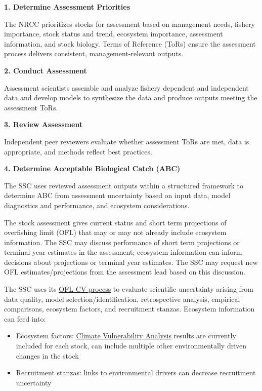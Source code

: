 \documentclass[
]{article}
\providecommand{\tightlist}{%
  \setlength{\itemsep}{0pt}\setlength{\parskip}{0pt}}
\begin{document}
\textbf{1. Determine Assessment Priorities}

The NRCC prioritizes stocks for assessment based on management needs,
fishery importance, stock status and trend, ecosystem importance, assessment information, and stock
biology. Terms of Reference (ToRs) ensure the assessment process delivers consistent, management-relevant outputs.

\textbf{2. Conduct Assessment}

Assessment scientists assemble and analyze fishery dependent and independent data and develop models to synthesize the data and produce outputs meeting the assessment ToRs.

\textbf{3. Review Assessment}

Independent peer reviewers evaluate whether assessment ToRs are met, data is appropriate, and methods reflect best practices.

\textbf{4. Determine Acceptable Biological Catch (ABC)}

The SSC uses reviewed assessment outputs within a structured framework to determine ABC from assessment uncertainty based on input data, model diagnostics and performance, and ecosystem considerations.

The stock assessment gives current status and short term projections of overfishing limit (OFL) that may or may not already include ecosystem information. The SSC may discuss performance of short term projections or terminal year estimates in the assessment; ecosystem information can inform decisions about projections or terminal year estimates. The SSC may request new OFL estimates/projections from the assessment lead based on this discussion.

The SSC uses its \href{https://www.mafmc.org/s/Final-OFL-CV-guidance-document_06_24.pdf}{OFL CV process} to evaluate scientific uncertainty arising from data quality, model selection/identification, retrospective analysis, empirical comparisons, ecosystem factors, and recruitment stanzas. Ecosystem information can feed into:

\begin{itemize}
\tightlist
\item
  Ecosystem factors: \href{https://journals.plos.org/plosone/article?id=10.1371/journal.pone.0146756}{Climate Vulnerability Analysis} results are currently included for each stock, can include multiple other environmentally driven changes in the stock
\item
  Recruitment stanzas: links to environmental drivers can decrease recruitment uncertainty
\end{itemize}
\end{document}
